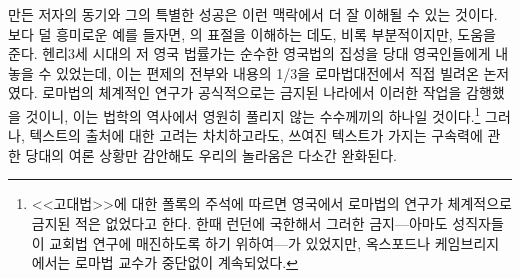 만든 저자의 동기와 그의 특별한 성공은 이런 맥락에서
더 잘 이해될 수 있는 것이다.
보다 덜 흥미로운 예를 들자면, 의 표절을 이해하는 데도,
비록 부분적이지만, 도움을 준다.
헨리3세 시대의 저 영국 법률가는
순수한 영국법의 집성을 당대 영국인들에게 내놓을 수 있었는데,
이는 편제의 전부와 내용의 1/3을 로마법대전에서 직접 빌려온 논저였다.
로마법의 체계적인 연구가 공식적으로는 금지된 나라에서
이러한 작업을 감행했을 것이니,
이는 법학의 역사에서 영원히 풀리지 않는
수수께끼의 하나일 것이다.\footnote{%
  <<고대법>>에 대한 폴록의 주석에 따르면 영국에서 로마법의 연구가
  체계적으로 금지된 적은 없었다고 한다. 한때 런던에 국한해서
  그러한 금지---아마도 성직자들이 교회법 연구에 매진하도록 하기 위하여---가
  있었지만, 옥스포드나 케임브리지에서는 로마법 교수가 중단없이
  계속되었다. }
그러나, 텍스트의 출처에 대한 고려는 차치하고라도,
쓰여진 텍스트가 가지는 구속력에 관한 당대의 여론 상황만 감안해도
우리의 놀라움은 다소간 완화된다.

